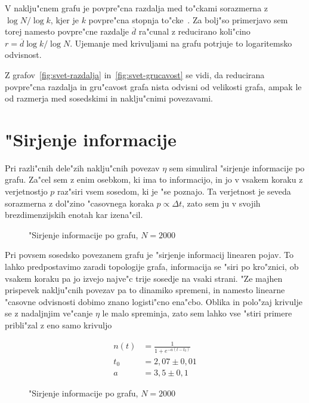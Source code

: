 \documentclass[a4paper,10pt]{article}
\begin{document}
V naklju"cnem grafu je povpre"cna razdalja med to"ckami sorazmerna z $\log N / \log k$, kjer je $k$ povpre"cna stopnja to"cke~\cite{graf}. Za bolj"so primerjavo sem torej namesto povpre"cne razdalje $\overline d$ ra"cunal z reducirano koli"cino $r = \overline d\log k /\log N$. Ujemanje med krivuljami na grafu potrjuje to logaritemsko odvisnost. 

Z grafov~\ref{fig:svet-razdalja} in~\ref{fig:svet-grucavost} se vidi, da reducirana povpre"cna razdalja in gru"cavost grafa nista odvisni od velikosti grafa, ampak le od razmerja med sosedskimi in naklju"cnimi povezavami. 

\section{"Sirjenje informacije}

Pri razli"cnih dele"zih naklju"cnih povezav $\eta$ sem simuliral "sirjenje informacije po grafu. Za"cel sem z enim osebkom, ki ima to informacijo, in jo v vsakem koraku z verjetnostjo $p$ raz"siri vsem sosedom, ki je "se poznajo. Ta verjetnost je seveda sorazmerna z dol"zino "casovnega koraka $p \propto \Delta t$, zato sem ju v svojih brezdimenzijskih enotah kar izena"cil. 

\begin{figure}[!h]
 
  \caption{"Sirjenje informacije po grafu, $N=2000$}
\label{fig:sirjenje-2000}
\end{figure}

Pri povsem sosedsko povezanem grafu je "sirjenje informacij linearen pojav. To lahko predpostavimo zaradi topologije grafa, informacija se "siri po kro"znici, ob vsakem koraku pa jo izvejo najve"c trije sosedje na vsaki strani. "Ze majhen prispevek naklju"cnih povezav pa to dinamiko spremeni, in namesto linearne "casovne odvisnosti dobimo znano logisti"cno ena"cbo. Oblika in polo"zaj krivulje se z nadaljnjim ve"canje $\eta$ le malo spreminja, zato sem lahko vse "stiri primere pribli"zal z eno samo krivuljo

\begin{align}
 n(t) &= \frac{1}{1+e^{-a(t-t_0)}} \\
 t_0 &= 2,07 \pm 0,01 \\
 a &= 3,5 \pm 0,1
\end{align}


\begin{figure}[!h]
 
  \caption{"Sirjenje informacije po grafu, $N=2000$}
\label{fig:sirjenje-2000-r}
\end{figure}
\end{document}
